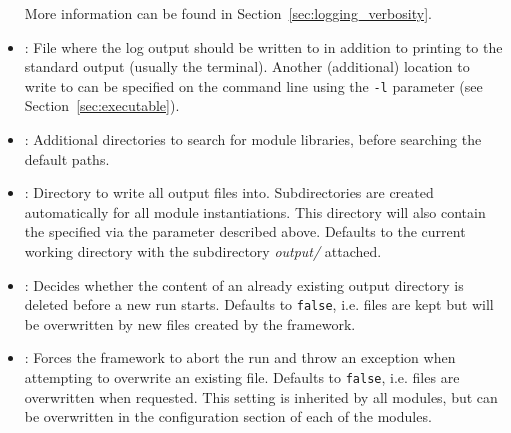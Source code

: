 \begin{itemize}
More information can be found in Section~\ref{sec:logging_verbosity}.
\item {}: File where the log output should be written to in addition to printing to the standard output (usually the terminal).
Another (additional) location to write to can be specified on the command line using the \texttt{-l} parameter (see Section~\ref{sec:executable}).
\item {}: Additional directories to search for module libraries, before searching the default paths.
\item {}: Directory to write all output files into.
Subdirectories are created automatically for all module instantiations.
This directory will also contain the  specified via the parameter described above.
Defaults to the current working directory with the subdirectory \textit{output/} attached.
\item {}: Decides whether the content of an already existing output directory is deleted before a new run starts. Defaults to \texttt{false}, i.e. files are kept but will be overwritten by new files created by the framework.
\item {}: Forces the framework to abort the run and throw an exception when attempting to overwrite an existing file. Defaults to \texttt{false}, i.e. files are overwritten when requested. This setting is inherited by all modules, but can be overwritten in the configuration section of each of the modules.
\end{itemize}

